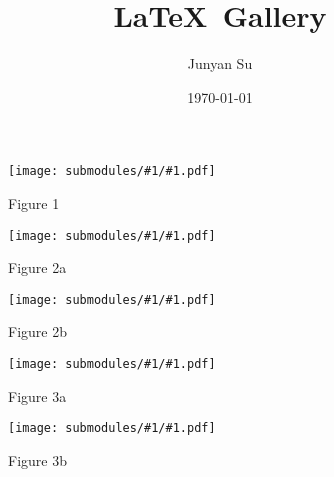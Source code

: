\documentclass{article}
\title{\LaTeX\, Gallery}
\author{Junyan Su}
\date{\today}
\begin{document}
\maketitle

\newcommand{\includeSubmodule}[1]{
    \begin{figure}[ht]
        \begin{center}
            \texttt{[image: submodules/\#1/\#1.pdf]}
        \end{center} 
        \caption*{Figure #1}
    \end{figure}
}
\includeSubmodule{1}
\includeSubmodule{2a}
\includeSubmodule{2b}
\includeSubmodule{3a}
\includeSubmodule{3b}



%
%
\end{document}
